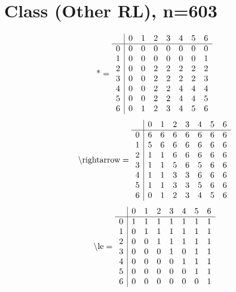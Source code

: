 \documentclass[11pt]{article}
\begin{document}
\section{Class (Other RL), n=603}
\[\text{*} = 
\begin{array}{r | r r r r r r r}
 & 0 & 1 & 2 & 3 & 4 & 5 & 6 \\ \hline
0 & 0 & 0 & 0 & 0 & 0 & 0 & 0 \\
1 & 0 & 0 & 0 & 0 & 0 & 0 & 1 \\
2 & 0 & 0 & 2 & 2 & 2 & 2 & 2 \\
3 & 0 & 0 & 2 & 2 & 2 & 2 & 3 \\
4 & 0 & 0 & 2 & 2 & 4 & 4 & 4 \\
5 & 0 & 0 & 2 & 2 & 4 & 4 & 5 \\
6 & 0 & 1 & 2 & 3 & 4 & 5 & 6 \\
\end{array}
\]
\[\text{\textbackslash rightarrow} = 
\begin{array}{r | r r r r r r r}
 & 0 & 1 & 2 & 3 & 4 & 5 & 6 \\ \hline
0 & 6 & 6 & 6 & 6 & 6 & 6 & 6 \\
1 & 5 & 6 & 6 & 6 & 6 & 6 & 6 \\
2 & 1 & 1 & 6 & 6 & 6 & 6 & 6 \\
3 & 1 & 1 & 5 & 6 & 5 & 6 & 6 \\
4 & 1 & 1 & 3 & 3 & 6 & 6 & 6 \\
5 & 1 & 1 & 3 & 3 & 5 & 6 & 6 \\
6 & 0 & 1 & 2 & 3 & 4 & 5 & 6 \\
\end{array}
\]
\[\text{\textbackslash le} = 
\begin{array}{r | r r r r r r r}
 & 0 & 1 & 2 & 3 & 4 & 5 & 6 \\ \hline
0 & 1 & 1 & 1 & 1 & 1 & 1 & 1 \\
1 & 0 & 1 & 1 & 1 & 1 & 1 & 1 \\
2 & 0 & 0 & 1 & 1 & 1 & 1 & 1 \\
3 & 0 & 0 & 0 & 1 & 0 & 1 & 1 \\
4 & 0 & 0 & 0 & 0 & 1 & 1 & 1 \\
5 & 0 & 0 & 0 & 0 & 0 & 1 & 1 \\
6 & 0 & 0 & 0 & 0 & 0 & 0 & 1 \\
\end{array}
\]
\end{document}
